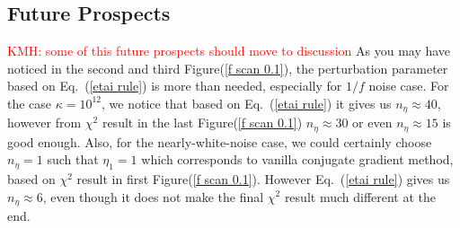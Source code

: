 \documentclass[twocolumn,linenumbers]{aastex631}
\newcommand{\kmh}[1]{\textcolor{red}{KMH: #1}}
\begin{document}
\subsection{Future Prospects}

\kmh{some of this future prospects should move to discussion}
As you may have noticed in the second and third Figure(\ref{f scan 0.1}),
the perturbation parameter based on
Eq.~(\ref{etai rule}) is more than needed, especially for $1/f$ noise case.
For the case $\kappa=10^{12}$, we notice that based on Eq.~(\ref{etai rule})
it gives us $n_{\eta}\approx40$, however from $\chi^2$
result in the last Figure(\ref{f scan 0.1}) 
$n_{\eta}\approx30$ or even $n_{\eta} \approx 15$ is good enough.
Also, for the nearly-white-noise case, we could certainly choose $n_{\eta}=1$
such that $\eta_1=1$ which corresponds to vanilla conjugate gradient method,
based on $\chi^2$ result in first Figure(\ref{f scan 0.1}).
However Eq.~(\ref{etai rule}) gives us $n_{\eta} \approx 6$,
even though it does not make the final $\chi^2$ result much different at the
end.
\end{document}
